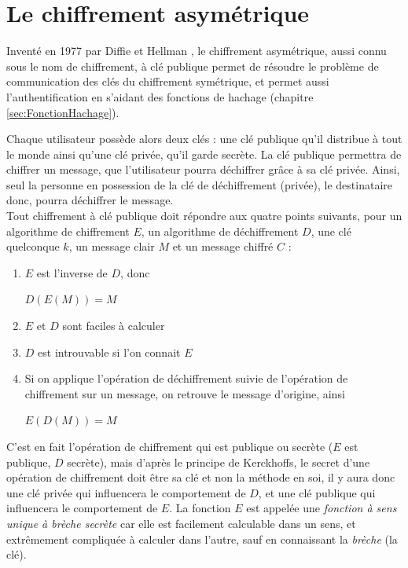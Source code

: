\section{Le chiffrement asymétrique}
Inventé en 1977 par Diffie et Hellman
\cite{NewDirectionsInCryptography}, le chiffrement asymétrique, aussi
connu sous le nom de chiffrement, à clé publique permet de résoudre le
problème de communication des clés du chiffrement symétrique, et
permet aussi l'authentification en s'aidant des fonctions de hachage 
(chapitre \ref{sec:FonctionHachage}). 

Chaque utilisateur possède alors deux clés : une clé publique qu'il
distribue à tout le monde ainsi qu'une clé privée, qu'il garde
secrète. La clé publique permettra de chiffrer un message, que
l'utilisateur pourra déchiffrer grâce à sa clé privée. Ainsi, seul la
personne en possession de la clé de déchiffrement (privée), le
destinataire donc, pourra déchiffrer le message. \\

Tout chiffrement à clé publique doit répondre aux quatre points
suivants, pour un algorithme de chiffrement $E$, un algorithme de
déchiffrement $D$, une clé quelconque $k$, un message clair $M$ et un
message chiffré $C$ : 
\begin{enumerate}
  \item $E$ est l'inverse de $D$, donc
    \begin{center}
      $D(E(M)) = M$
    \end{center}
  \item $E$ et $D$ sont faciles à calculer
  \item $D$ est introuvable si l'on connait $E$
  \item Si on applique l'opération de déchiffrement suivie de
    l'opération de chiffrement sur un message, on retrouve le message
    d'origine, ainsi
    \begin{center}
      $E(D(M)) = M$
    \end{center}
\end{enumerate}

C'est en fait l'opération de chiffrement qui est publique ou secrète
($E$ est publique, $D$ secrète), mais d'après le principe de
Kerckhoffs, le secret d'une opération de chiffrement doit être sa clé
et non la méthode en soi, il y aura donc une clé privée qui
influencera le comportement de $D$, et une clé publique qui
influencera le comportement de $E$. La fonction $E$ est appelée une
\emph{fonction à sens unique à brèche secrète} 
car elle est facilement calculable dans un sens, et extrêmement
compliquée à calculer dans l'autre,
sauf en connaissant la \emph{brèche} (la clé).

